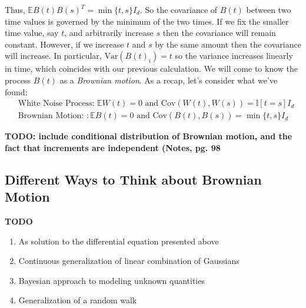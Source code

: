 \documentclass[12pt]{article}
\newcommand{\E}{\mathbb{E}}
\newcommand{\Var}{\mathrm{Var}}
\newcommand{\Cov}{\mathrm{Cov}}
\begin{document}
Thus, $\E B(t)B(s)^T = \min\{t, s\} I_d$. So the covariance of $B(t)$ between two time values is governed by the minimum of the two times. If we fix the smaller time 
value, say $t$, and arbitrarily increase $s$ then the covariance will remain constant. However, if we increase $t$ and $s$ by the same amount then the covariance 
will increase. In particular, $\Var(B(t)_i) = t$ so the variance increases linearly in time, which coincides with our previous calculation. We will come to know the process $B(t)$ as a \textit{Brownian motion}. As a recap, let's consider what we've found: 
\begin{align*}
&\text{White Noise Process: } \E W(t) = 0 \text{ and } \Cov(W(t), W(s)) = \mathbb{I}[t = s]I_d \\
&\text{Brownian Motion: }: \E B(t) = 0 \text{ and } \Cov(B(t), B(s)) =  \min\{t, s\} I_d
\end{align*}

\textbf{TODO: include conditional distribution of Brownian motion, and the fact that increments are independent (Notes, pg. 98}

\subsection{Different Ways to Think about Brownian Motion}
\textbf{TODO}
\begin{enumerate}
\item As solution to the differential equation presented above 
\item Continuous generalization of linear combination of Gaussians
\item Bayesian approach to modeling unknown quantities 
\item Generalization of a random walk
\end{enumerate}
\end{document}
